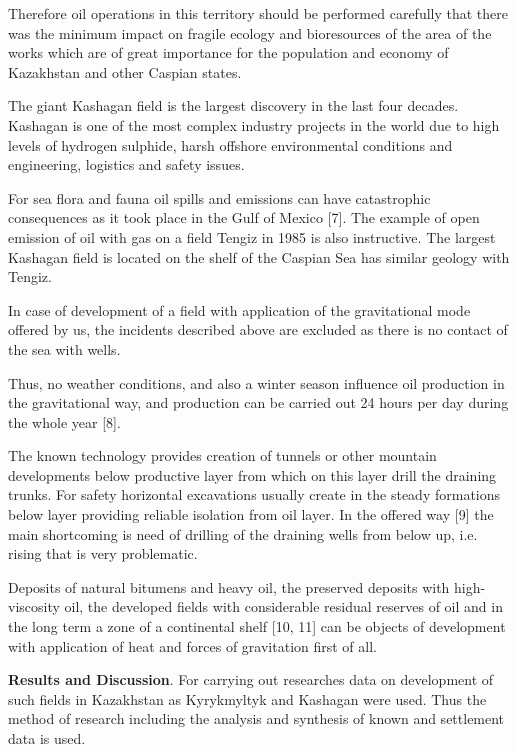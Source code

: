 Therefore oil operations in this territory should be performed carefully
that there was the minimum impact on fragile ecology and bioresources of
the area of the works which are of great importance for the population
and economy of Kazakhstan and other Caspian states.

The giant Kashagan field is the largest discovery in the last four
decades. Kashagan is one of the most complex industry projects in the
world due to high levels of hydrogen sulphide, harsh offshore
environmental conditions and engineering, logistics and safety issues.

For sea flora and fauna oil spills and emissions can have catastrophic
consequences as it took place in the Gulf of Mexico {[}7{]}. The example
of open emission of oil with gas on a field Tengiz in 1985 is also
instructive. The largest Kashagan field is located on the shelf of the
Caspian Sea has similar geology with Tengiz.

In case of development of a field with application of the gravitational
mode offered by us, the incidents described above are excluded as there
is no contact of the sea with wells.

Thus, no weather conditions, and also a winter season influence oil
production in the gravitational way, and production can be carried out
24 hours per day during the whole year {[}8{]}.

The known technology provides creation of tunnels or other mountain
developments below productive layer from which on this layer drill the
draining trunks. For safety horizontal excavations usually create in the
steady formations below layer providing reliable isolation from oil
layer. In the offered way {[}9{]} the main shortcoming is need of
drilling of the draining wells from below up, i.e. rising that is very
problematic.

Deposits of natural bitumens and heavy oil, the preserved deposits with
high-viscosity oil, the developed fields with considerable residual
reserves of oil and in the long term a zone of a continental shelf
{[}10, 11{]} can be objects of development with application of heat and
forces of gravitation first of all.

{\bfseries Results and Discussion}. For carrying out researches data on
development of such fields in Kazakhstan as Kyrykmyltyk and Kashagan
were used. Thus the method of research including the analysis and
synthesis of known and settlement data is used.

